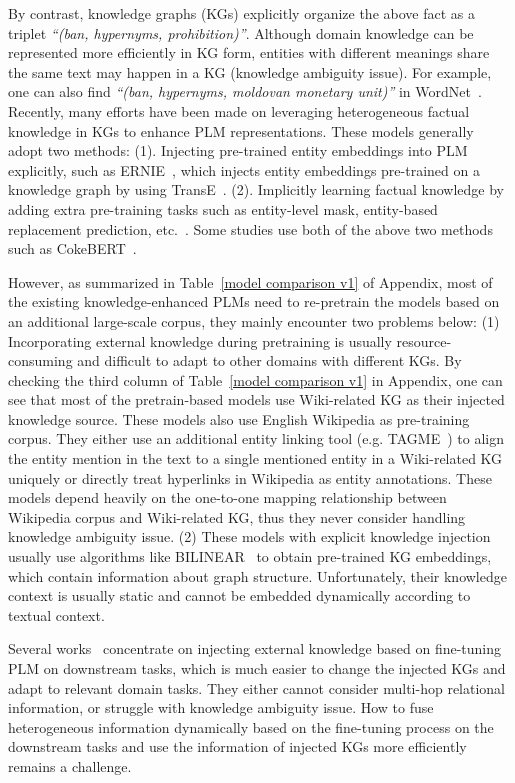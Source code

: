 \documentclass{article} \usepackage{iclr2022_conference,times}
\begin{document}
By contrast, knowledge graphs (KGs) explicitly organize the above fact as a triplet \textit{``(ban, hypernyms, prohibition)''}. Although domain knowledge can be represented more efficiently in KG form, entities with different meanings share the same text may happen in a KG (knowledge ambiguity issue). For example, one can also find \textit{``(ban, hypernyms, moldovan monetary unit)''} in WordNet~\citep{Miller95wordnet:a}. 
Recently, many efforts have been made on leveraging heterogeneous factual knowledge in KGs to enhance PLM representations. These models generally adopt two methods: (1). Injecting pre-trained entity embeddings into PLM explicitly, such as ERNIE~\citep{zhang2019ernie}, which injects entity embeddings pre-trained on a knowledge graph by using TransE~\citep{Bordes2013TranslatingEF}. 
(2). Implicitly learning factual knowledge by adding extra pre-training tasks such as entity-level mask, entity-based replacement prediction, etc.~\citep{wang2020kadapter, sun2020colake}. Some studies use both of the above two methods such as CokeBERT~\citep{su2020cokebert}. 

However, as summarized in Table~\ref{model comparison v1} of Appendix, most of the existing knowledge-enhanced PLMs need to re-pretrain the models based on an additional large-scale corpus, they mainly encounter two problems below: 
(1) Incorporating external knowledge during pretraining is usually resource-consuming and difficult to adapt to other domains with different KGs. By checking the third column of Table~\ref{model comparison v1} in Appendix, one can see that most of the pretrain-based models use Wiki-related KG as their injected knowledge source. These models also use English Wikipedia as pre-training corpus. They either use an additional entity linking tool (e.g. TAGME~\citep{Ferragina2010TAGMEOA}) to align the entity mention in the text to a single mentioned entity in a Wiki-related KG uniquely or directly treat hyperlinks in Wikipedia as entity annotations. These models depend heavily on the one-to-one mapping relationship between Wikipedia corpus and Wiki-related KG, thus they never consider handling knowledge ambiguity issue.
(2) These models with explicit knowledge injection usually use algorithms like BILINEAR~\citep{yang2015embedding} to obtain pre-trained KG embeddings, which contain information about graph structure. Unfortunately, their knowledge context is usually static and cannot be embedded dynamically according to textual context.

Several works~\citep{qiu-etal-2019-machine, yang-etal-2019-enhancing-pre} concentrate on injecting external knowledge based on fine-tuning PLM on downstream tasks, which is much easier to change the injected KGs and adapt to relevant domain tasks. They either cannot consider multi-hop relational information, or struggle with knowledge ambiguity issue. How to fuse heterogeneous information dynamically based on the fine-tuning process on the downstream tasks and use the information of injected KGs more efficiently remains a challenge.
\end{document}
